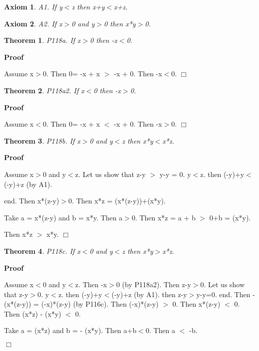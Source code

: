 \documentclass{article}
\newenvironment{forthel}{\begin{leftbar}}{\end{leftbar}}
\newenvironment{proof}{\noindent\textbf{Proof\ }}{\hspace*{\fill}$\Box$\medskip}
\newtheorem{axiom}{Axiom}
\newtheorem{theorem}{Theorem}
\begin{document}
\begin{forthel}
	\begin{axiom} A1. If y$<$z then x+y$<$x+z.

\end{axiom}
	\begin{axiom} A2. If x$>$0 and y$>$0 then x*y$>$0.

\end{axiom}
	
	\begin{theorem}
 P118a. If x$>$0 then -x$<$0. 
\end{theorem}	\begin{proof}

	Assume x$>$0. Then 0= -x + x $>$ -x + 0.
	Then -x$<$0.
	\end{proof}

	\begin{theorem}
 P118a2. If x$<$0 then -x$>$0. 
\end{theorem}	\begin{proof}

	Assume x$<$0. Then 0= -x + x $<$ -x + 0.
	Then -x$>$0.
	\end{proof}

	\begin{theorem}
 P118b. If x$>$0 and y$<$z then x*y$<$x*z.
\end{theorem}	\begin{proof}

	Assume x$>$0 and y$<$z. 
	Let us show that z-y $>$ y-y = 0.
	y$<$z.
	then (-y)+y$<$(-y)+z (by A1).
	
	end.
	Then x*(z-y)$>$0.
	Then x*z = (x*(z-y))+(x*y).
	
	Take a = x*(z-y) and b = x*y.
	Then a$>$0.
	Then x*z = a + b $>$ 0+b = (x*y).
	
	Then x*z $>$ x*y.
	\end{proof}

	\begin{theorem}
 P118c. If x$<$0 and y$<$z then x*y$>$x*z.
\end{theorem}	\begin{proof}

	Assume x$<$0 and y$<$z.
	Then -x$>$0 (by P118a2).
	Then z-y$>$0. 
	Let us show that z-y$>$0.
	y$<$z.
	then (-y)+y$<$(-y)+z (by A1).
	then z-y$>$y-y=0.
	end.
	Then -(x*(z-y)) = (-x)*(z-y) (by P116c).
	Then (-x)*(z-y) $>$ 0.
	Then x*(z-y) $<$ 0.
	Then (x*z) - (x*y) $<$ 0.
	
	Take a = (x*z) and b = - (x*y).
	Then a+b$<$0.
	Then a $<$ -b.
	

\end{proof}
\end{forthel}
\end{document}
